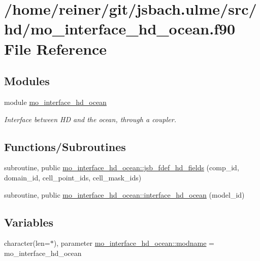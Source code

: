 \hypertarget{mo__interface__hd__ocean_8f90}{}\section{/home/reiner/git/jsbach.ulme/src/hd/mo\+\_\+interface\+\_\+hd\+\_\+ocean.f90 File Reference}
\label{mo__interface__hd__ocean_8f90}
\subsection*{Modules}
\begin{DoxyCompactItemize}
\item 
module \hyperlink{namespacemo__interface__hd__ocean}{mo\+\_\+interface\+\_\+hd\+\_\+ocean}
\begin{DoxyCompactList}\small\item\em Interface between H\+D and the ocean, through a coupler. \end{DoxyCompactList}\end{DoxyCompactItemize}
\subsection*{Functions/\+Subroutines}
\begin{DoxyCompactItemize}
\item 
subroutine, public \hyperlink{namespacemo__interface__hd__ocean_aae89e81e8ed8ff0ac60174e3e3401fc3}{mo\+\_\+interface\+\_\+hd\+\_\+ocean\+::jsb\+\_\+fdef\+\_\+hd\+\_\+fields} (comp\+\_\+id, domain\+\_\+id, cell\+\_\+point\+\_\+ids, cell\+\_\+mask\+\_\+ids)
\item 
subroutine, public \hyperlink{namespacemo__interface__hd__ocean_a40fcf1b57ea23f20ee39471869865086}{mo\+\_\+interface\+\_\+hd\+\_\+ocean\+::interface\+\_\+hd\+\_\+ocean} (model\+\_\+id)
\end{DoxyCompactItemize}
\subsection*{Variables}
\begin{DoxyCompactItemize}
\item 
character(len=$\ast$), parameter \hyperlink{namespacemo__interface__hd__ocean_a4263037e844d6da838dd6086322fc107}{mo\+\_\+interface\+\_\+hd\+\_\+ocean\+::modname} = \textquotesingle{}mo\+\_\+interface\+\_\+hd\+\_\+ocean\textquotesingle{}
\end{DoxyCompactItemize}
